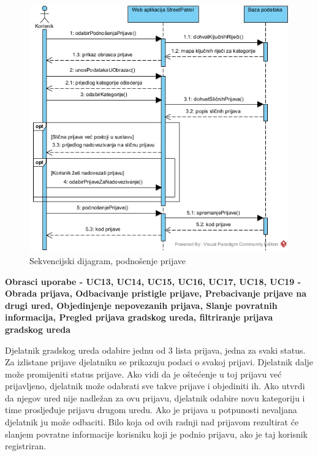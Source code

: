 				\begin{figure}[H]
					\includegraphics[width=\textwidth]{slike/Podnosenje_prijaveSD.jpg} %
					\caption{Sekvencijski dijagram, podnošenje prijave}
					\label{fig:sekvencijskiDijagram2} %
				\end{figure}
				\eject
				
				\textbf{Obrasci uporabe - UC13, UC14, UC15, UC16, UC17, UC18, UC19 - Obrada prijava, Odbacivanje pristigle prijave, Prebacivanje prijave na drugi ured, Objedinjenje nepovezanih prijava, Slanje povratnih informacija, Pregled prijava gradskog ureda, filtriranje prijava gradskog ureda}
				
				Djelatnik gradskog ureda odabire jednu od 3 lista prijava, jedna za svaki status. Za izlistane prijave djelatniku se prikazuju podaci o svakoj prijavi. Djelatnik dalje može promijeniti status prijave. Ako vidi da je oštećenje u toj prijavu već prijavljeno, djelatnik može odabrati sve takve prijave i objediniti ih. Ako utvrdi da njegov ured nije nadležan za ovu prijavu, djelatnik odabire novu kategoriju i time prosljeđuje prijavu drugom uredu. Ako je prijava u potpunosti nevaljana djelatnik ju može odbaciti. Bilo koja od ovih radnji nad prijavom rezultirat će slanjem povratne informacije korisniku koji je podnio prijavu, ako je taj korisnik registriran.
				

